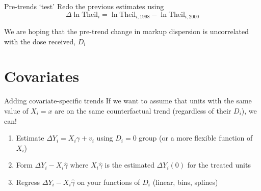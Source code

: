 \documentclass[aspectratio=169,t]{beamer}
\begin{document}


\begin{frame}{Pre-trends `test'}
  Redo the previous estimates using
  $$
    \Delta \ln \text{Theil}_i = \ln \text{Theil}_{i, 1998} - \ln \text{Theil}_{i, 2000}
  $$

  \bigskip
  We are hoping that the pre-trend change in markup dispersion is uncorrelated with the dose received, $D_i$
\end{frame}


\section*{Covariates}

\begin{frame}[fragile]{Adding covariate-specific trends}
  If we want to assume that units with the same value of $X_i = x$ are on the same counterfactual trend (regardless of their $D_i$), we can!

  \begin{enumerate}
    \item Estimate $\Delta Y_i = X_i \gamma + v_i$ using $D_i = 0$ group (or a more flexible function of $X_i$)
    
    \item Form $\Delta Y_i - X_i \hat{\gamma}$ where $X_i \hat{\gamma}$ is the estimated $\Delta Y_i(0)$ for the treated units
    
    \item Regress $\Delta Y_i - X_i \hat{\gamma}$ on your functions of $D_i$ (linear, bins, splines)
  \end{enumerate}
\end{frame}
\end{document}
